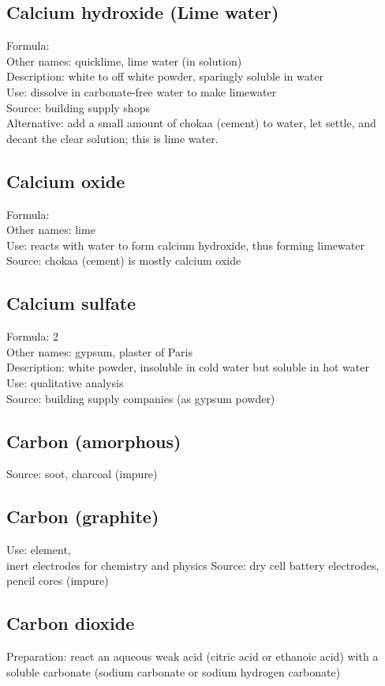 \subsection{Calcium hydroxide (Lime water)}
Formula: \\
Other names: quicklime, lime water (in solution)\\
Description: white to off white powder, 
sparingly soluble in water\\
Use: dissolve in carbonate-free water to make limewater\\
Source: building supply shops\\
Alternative: add a small amount of chokaa (cement) to water, 
let settle, 
and decant the clear solution; 
this is lime water.
\subsection{Calcium oxide}
Formula: \\
Other names: lime\\
Use: reacts with water to form calcium hydroxide, 
thus forming limewater\\
Source: chokaa (cement) is mostly calcium oxide
\subsection{Calcium sulfate}
Formula:  2\\
Other names: gypsum, 
plaster of Paris\\
Description: white powder, 
insoluble in cold water but soluble in hot water\\
Use: qualitative analysis\\
Source: building supply companies (as gypsum powder)
\subsection{Carbon (amorphous)}
Source: soot, 
charcoal (impure)
\subsection{Carbon (graphite)}
\label{sec:carbongraphite}
Use: element, \\
inert electrodes for chemistry and physics
Source: dry cell battery electrodes, 
pencil cores (impure)
\subsection{Carbon dioxide}
Preparation: react an aqueous weak acid 
(citric acid or ethanoic acid) with a soluble carbonate 
(sodium carbonate or sodium hydrogen carbonate)
